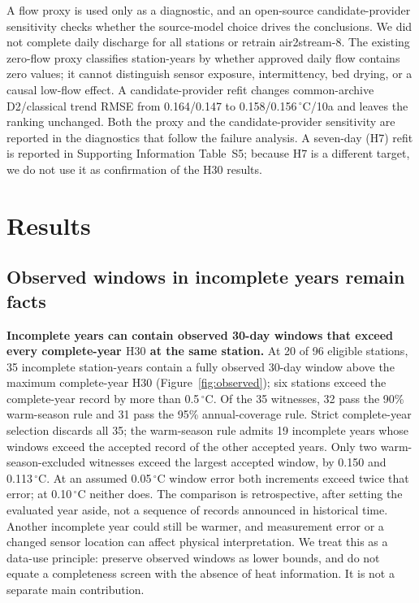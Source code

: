 A flow proxy is used only as a diagnostic, and an open-source candidate-provider sensitivity checks whether the source-model choice drives the conclusions. We did not complete daily discharge for all stations or retrain air2stream-8. The existing zero-flow proxy classifies station-years by whether approved daily flow contains zero values; it cannot distinguish sensor exposure, intermittency, bed drying, or a causal low-flow effect. A candidate-provider refit changes common-archive D2/classical trend RMSE from 0.164/0.147 to 0.158/0.156\,$^{\circ}$C/10a and leaves the ranking unchanged. Both the proxy and the candidate-provider sensitivity are reported in the diagnostics that follow the failure analysis. A seven-day (H7) refit is reported in Supporting Information Table~S5; because H7 is a different target, we do not use it as confirmation of the $\mathrm{H30}$ results.


\section{Results}

\subsection{Observed windows in incomplete years remain facts}

\textbf{Incomplete years can contain observed 30-day windows that exceed every complete-year $\mathrm{H30}$ at the same station.} At 20 of 96 eligible stations, 35 incomplete station-years contain a fully observed 30-day window above the maximum complete-year $\mathrm{H30}$ (Figure~\ref{fig:observed}); six stations exceed the complete-year record by more than 0.5\,$^{\circ}$C. Of the 35 witnesses, 32 pass the 90\% warm-season rule and 31 pass the 95\% annual-coverage rule. Strict complete-year selection discards all 35; the warm-season rule admits 19 incomplete years whose windows exceed the accepted record of the other accepted years. Only two warm-season-excluded witnesses exceed the largest accepted window, by 0.150 and 0.113\,$^{\circ}$C. At an assumed 0.05\,$^{\circ}$C window error both increments exceed twice that error; at 0.10\,$^{\circ}$C neither does. The comparison is retrospective, after setting the evaluated year aside, not a sequence of records announced in historical time. Another incomplete year could still be warmer, and measurement error or a changed sensor location can affect physical interpretation. We treat this as a data-use principle: preserve observed windows as lower bounds, and do not equate a completeness screen with the absence of heat information. It is not a separate main contribution.

